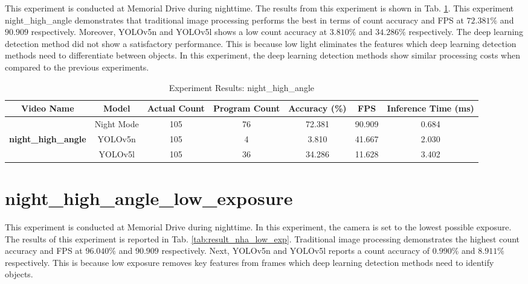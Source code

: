 \documentclass[12pt,a4paper,fleqn]{report}
\begin{document}
This experiment is conducted at Memorial Drive during nighttime.
The results from this experiment is shown in Tab. \ref{tab:result_nha}.
This experiment night\_high\_angle demonstrates that traditional image processing performs the best
in terms of count accuracy and FPS at $72.381\%$ and $90.909$ respectively.
Moreover, YOLOv5n and YOLOv5l shows a low count accuracy at $3.810\%$ and $34.286\%$ respectively.
The deep learning detection method did not show a satisfactory performance.
This is because low light eliminates the features which deep learning detection methods need to
differentiate between objects.
In this experiment, the deep learning detection methods show similar processing costs when compared
to the previous experiments.

\begin{table}[htbp]
    \centering
    \begin{adjustbox}{width=1\textwidth}
    \begin{tabular}{|c|c|c|c|c|c|c|}
    \hline
    \textbf{Video Name} & \textbf{Model} & \textbf{Actual Count} & \textbf{Program Count} & \textbf{Accuracy (\%)} & \textbf{FPS} & \textbf{Inference Time (ms)} \\ \hline
     & Night Mode & 105 & 76 & 72.381 & 90.909 & 0.684 \\ \cline{2-7}
    \textbf{night\_high\_angle} & YOLOv5n & 105 & 4 & 3.810 & 41.667 & 2.030 \\ \cline{2-7}
     & YOLOv5l & 105 & 36 & 34.286 & 11.628 & 3.402 \\ \hline
    \end{tabular}
    \end{adjustbox}
\caption{Experiment Results: night\_high\_angle}
\label{tab:result_nha}
\end{table}

\section{night\_high\_angle\_low\_exposure}

This experiment is conducted at Memorial Drive during nighttime.
In this experiment, the camera is set to the lowest possible exposure.
The results of this experiment is reported in Tab. \ref{tab:result_nha_low_exp}.
Traditional image processing demonstrates the highest count accuracy and FPS at $96.040\%$ and
$90.909$ respectively.
Next, YOLOv5n and YOLOv5l reports a count accuracy of $0.990\%$ and $8.911\%$ respectively.
This is because low exposure removes key features from frames which deep learning detection methods
need to identify objects.
\end{document}
